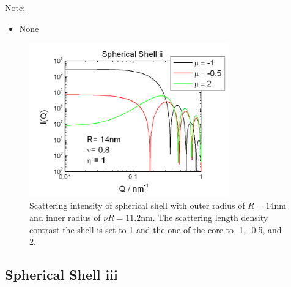 \noindent\uline{Note:}
\begin{itemize}
\item[~] None
\end{itemize}

\begin{figure}[htb]
\begin{center}
\includegraphics[width=0.768\textwidth]{../images/form_factor/spheres/shell_ii_P.png}
\end{center}
\caption{Scattering intensity of spherical shell with outer radius of $R=14$nm
and inner radius of $\nu R=11.2$nm. The scattering length density contrast the shell is set to 1
and the one of the core to -1, -0.5, and 2.} \label{fig:I_shell_ii}
\end{figure}

\clearpage
\subsection{Spherical Shell iii}
\label{sect:spherical_shell_iii} ~\\

